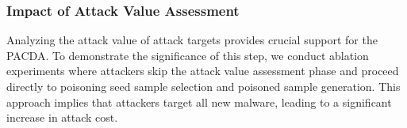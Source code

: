 \documentclass[conference,compsoc]{IEEEtran} %
\begin{document}
\subsubsection{Impact of Attack Value Assessment}
Analyzing the attack value of attack targets provides crucial support for the PACDA.
To demonstrate the significance of this step, we conduct ablation experiments where attackers skip the attack value assessment phase and proceed directly to poisoning seed sample selection and poisoned sample generation.
This approach implies that attackers target all new malware, leading to a significant increase in attack cost.
\begin{table}[h!]
	\caption{Attack value assessment necessity analysis}
	\label{tab: Attack Value Assessment necessity analysis}
	\setlength{\tabcolsep}{5.8pt}
	\begin{center}
	\end{center}
\end{table}
\end{document}

